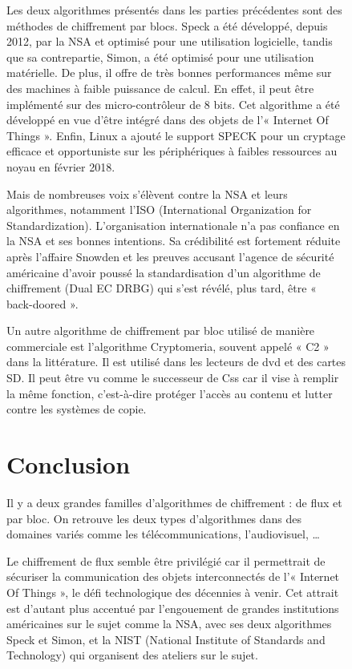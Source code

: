 \begin{figure}[!h]
	Les deux algorithmes présentés dans les parties précédentes sont des méthodes
	de chiffrement par blocs. Speck a été développé, depuis 2012, par la NSA et
	optimisé pour une utilisation logicielle, tandis que sa contrepartie, Simon, a
	été optimisé pour une utilisation matérielle. De plus, il offre de très bonnes
	performances même sur des machines à faible puissance de calcul. En effet, il
	peut être implémenté sur des micro-contrôleur de 8 bits. Cet algorithme a été
	développé en vue d'être intégré dans des objets de l'« Internet Of Things ».
	Enfin, Linux a ajouté le support SPECK pour un cryptage efficace et
	opportuniste sur les périphériques à faibles ressources au noyau en février
	2018.

	Mais de nombreuses voix s'élèvent contre la NSA et leurs algorithmes,
	notamment l'ISO (International Organization for Standardization).
	L'organisation internationale n'a pas confiance en la NSA et ses bonnes
	intentions. Sa crédibilité est fortement réduite après l'affaire Snowden et
	les preuves accusant l'agence de sécurité américaine d'avoir poussé la
	standardisation d'un algorithme de chiffrement (Dual EC DRBG) qui s'est
	révélé, plus tard, être « back-doored »\cite{NSABackdoor}.

	Un autre algorithme de chiffrement par bloc utilisé de manière commerciale est
	l'algorithme Cryptomeria, souvent appelé « C2 » dans la littérature. Il est
	utilisé dans les lecteurs de dvd et des cartes SD. Il peut être vu comme le
	successeur de Css car il vise à remplir la même fonction, c'est-à-dire
	protéger l'accès au contenu et lutter contre les systèmes de copie.
	\section{Conclusion}

	 Il y a deux grandes familles d'algorithmes de chiffrement : de flux et par
	bloc. On retrouve les deux types d'algorithmes dans des domaines variés comme
	les télécommunications, l'audiovisuel, \dots

	Le chiffrement de flux semble être privilégié car il permettrait de sécuriser
	la communication des objets interconnectés de l'« Internet Of Things », le
	défi technologique des décennies à venir. Cet attrait est d'autant plus
	accentué par l'engouement de grandes institutions américaines sur le sujet
	comme la NSA, avec ses deux algorithmes Speck et Simon, et la NIST (National
	Institute of Standards and Technology) qui organisent des ateliers sur le
	sujet.


\end{figure}
